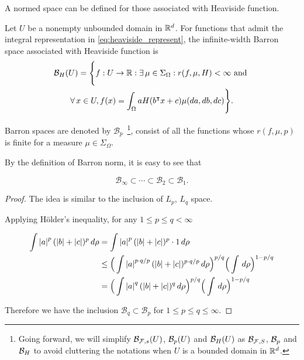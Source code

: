 A normed space can be defined for those associated with Heaviside function.

\begin{definition}
    \label{def:heaviside_space}
    Let $U$ be a nonempty unbounded domain in $\mathbb{R}^d$. For functions that admit
    the integral representation in \eqref{eq:heaviside_represent}, the
    infinite-width Barron space associated with Heaviside function is
    \begin{multline}
        \label{eq:heaviside_space}
        \mathcal{B}_H(U) = \Bigg\{
            f: U \to \mathbb{R} : \exists\, \mu \in \Sigma_{\Omega}:
            r(f, \mu, H) < \infty \textnormal{ and } \\
            \forall\, x \in U, f(x) = \int_{\Omega} a H(b{}^{\intercal} x + c) \mu(da, db, dc)
        \Bigg\}.
    \end{multline}
\end{definition}

Barron spaces are denoted by $\mathcal{B}_p$~\footnote{
    Going forward, we will simplify $\mathcal{B}_{\mathcal{F}, s}(U)$, $\mathcal{B}_p(U)$ 
    and $\mathcal{B}_H(U)$ as $\mathcal{B}_{\mathcal{F}, S}$, $\mathcal{B}_p$ and 
    $\mathcal{B}_H$ to avoid cluttering the notations when $U$ is a bounded domain
    in $\mathbb{R}^d$.
}, consist of all the functions whose $r(f, \mu, p)$ is finite for a measure 
$\mu \in \Sigma_{\Omega}$.

\begin{proposition}
    By the definition of Barron norm, it is easy to see that

    \begin{equation}
        \mathcal{B}_{\infty} \subset \cdots \subset \mathcal{B}_{2} 
        \subset \mathcal{B}_1.
    \end{equation}
\end{proposition}



\begin{proof}

The idea is similar to the inclusion of $L_p$, $L_q$ space.

Applying Hölder's inequality, for any $1 \leq p \leq q < \infty$

\begin{align*}
    \int \left| a \right|^p (\left| b \right| + \left| c \right|)^p \,d\rho
    & = \int \left| a \right|^p (\left| b \right| + \left| c \right|)^p \cdot 1 \,d\rho \\
    & \leq \Big(
        \int \left| a \right|^{p \cdot q/p} (\left| b \right| + \left| c \right|)^{p \cdot q/p} \,d\rho
    \Big)^{p/q} \Big(\int \,d\rho\Big)^{1-p/q} \\
    & = \Big(
        \int \left| a \right|^q (\left| b \right| + \left| c \right|)^q \,d\rho
    \Big)^{p/q} \Big(\int \,d\rho\Big)^{1-p/q}
\end{align*}

Therefore we have the inclusion $\mathcal{B}_{q} \subset \mathcal{B}_p$ for $1
    \leq p \leq q \leq \infty$.
\end{proof}

